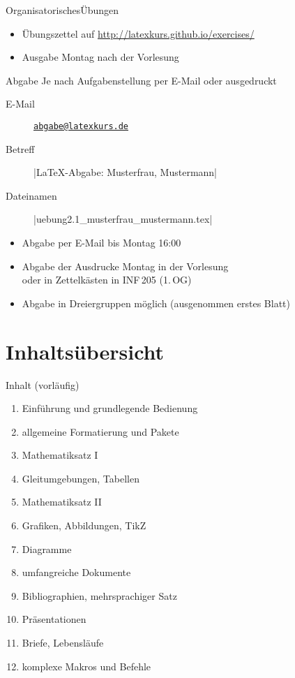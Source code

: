 \documentclass[
	vorläufig=false,
	datum=2018-10-15,
	titel={Einführung und grundlegende Bedienung},
	web=true,
	sebbo,
	aspectratio=1610,
]{../tex/latexkurs-slides}
\begin{document}
\begin{frame}[fragile, t]{Organisatorisches}{Übungen}
		\begin{itemize}
			\item Übungszettel auf \url{http://latexkurs.github.io/exercises/}
			\item Ausgabe Montag nach der Vorlesung
		\end{itemize}
	\pause
	\begin{block}{Abgabe}
	Je nach Aufgabenstellung per E-Mail oder ausgedruckt
		\begin{description}
			\item[E-Mail] \href{mailto:abgabe@latexkurs.de}{\texttt{abgabe@latexkurs.de}}\\
			\item[Betreff] |LaTeX-Abgabe: Musterfrau, Mustermann|\\
			\item[Dateinamen] |uebung2.1_musterfrau_mustermann.tex|
		\end{description}
		\vspace{-1ex}
		\begin{itemize}
			\item Abgabe per E-Mail bis Montag 16:00
			\item Abgabe der Ausdrucke Montag in der Vorlesung\\oder in Zettelkästen in INF\,205 (1.\,OG)
			\item Abgabe in Dreiergruppen möglich (ausgenommen erstes Blatt)
		\end{itemize}
	\end{block}
\end{frame}





\section{Inhaltsübersicht}

\begin{frame}{Inhalt (vorläufig)}
	\begin{enumerate}
		\item Einführung und grundlegende Bedienung
		\item allgemeine Formatierung und Pakete
		\item Mathematiksatz I
		\item Gleitumgebungen, Tabellen
		\item Mathematiksatz II
		\item Grafiken, Abbildungen, TikZ
		\item Diagramme
		\item umfangreiche Dokumente
		\item Bibliographien, mehrsprachiger Satz
		\item Präsentationen
		\item Briefe, Lebensläufe
		\item komplexe Makros und Befehle
	\end{enumerate}
\end{frame}
\end{document}
